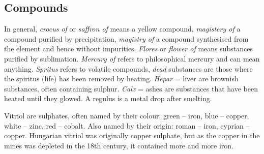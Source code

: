 \documentclass[british,final,landscape]{scrartcl}
\begin{document}
\begin{refsection}
\section{Compounds}

In general, \emph{crocus of} or \emph{saffron of} means a yellow compound, \emph{magistery of} a compound purified by precipitation, \emph{magistry of} a compound synthesised from the element and hence without impurities. \emph{Flores} or \emph{flower of} means substances purified by sublimation. \emph{Mercury of} refers to philosophical mercury and can mean anything. \emph{Spritus} refers to volatile compounds, \emph{dead} substances are those where the spiritus (life) has been removed by heating. \emph{Hepar} = liver are brownish substances, often containing sulphur. \emph{Calx} = ashes are substances that have been heated until they glowed. A regulus is a metal drop after smelting.

Vitriol are sulphates, often named by their colour: green -- iron, blue -- copper, white -- zinc, red -- cobalt. Also named by their origin: roman -- iron, cyprian -- copper. Hungarian vitriol was originally copper sulphate, but as the copper in the mines was depleted in the 18th century, it contained more and more iron.


\end{refsection}
\end{document}
